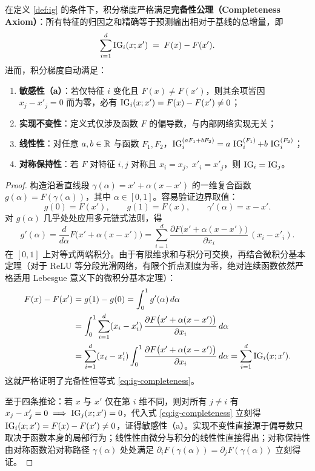 \begin{thmBox}
\begin{theorem}[积分梯度的完备性公理与导出性质]\label{thm:ig-completeness}
在定义 \ref{def:ig} 的条件下，积分梯度严格满足\textbf{完备性公理（Completeness Axiom）}：所有特征的归因之和精确等于预测输出相对于基线的总增量，即
\begin{equation}\label{eq:ig-completeness}
  \sum_{i=1}^d \operatorname{IG}_i(x; x') \;=\; F(x) - F(x').
\end{equation}
进而，积分梯度自动满足：
\begin{enumerate}
  \item \textbf{敏感性（a）}：若仅特征 $i$ 变化且 $F(x) \neq F(x')$，则其余项皆因 $x_j - x'_j = 0$ 而为零，必有 $\operatorname{IG}_i(x; x') = F(x) - F(x') \neq 0$；
  \item \textbf{实现不变性}：定义式仅涉及函数 $F$ 的偏导数，与内部网络实现无关；
  \item \textbf{线性性}：对任意 $a, b \in \mathbb{R}$ 与函数 $F_1, F_2$，$\operatorname{IG}_i^{(a F_1 + b F_2)} = a\,\operatorname{IG}_i^{(F_1)} + b\,\operatorname{IG}_i^{(F_2)}$；
  \item \textbf{对称保持性}：若 $F$ 对特征 $i, j$ 对称且 $x_i = x_j,\; x'_i = x'_j$，则 $\operatorname{IG}_i = \operatorname{IG}_j$。
\end{enumerate}
\end{theorem}
\end{thmBox}

\begin{proof}
构造沿着直线段 $\gamma(\alpha) = x' + \alpha(x - x')$ 的一维复合函数 $g(\alpha) = F(\gamma(\alpha))$，其中 $\alpha \in [0, 1]$。容易验证边界取值：
\[
  g(0) = F(x'), \qquad g(1) = F(x), \qquad \gamma'(\alpha) = x - x'.
\]
对 $g(\alpha)$ 几乎处处应用多元链式法则，得
\[
  g'(\alpha) = \frac{d}{d\alpha} F\big(x' + \alpha(x - x')\big)
  = \sum_{i=1}^d \frac{\partial F\big(x' + \alpha(x - x')\big)}{\partial x_i}\,(x_i - x'_i).
\]
在 $[0, 1]$ 上对等式两端积分。由于有限维求和与积分可交换，再结合微积分基本定理（对于 ReLU 等分段光滑网络，有限个折点测度为零，绝对连续函数依然严格适用 Lebesgue 意义下的微积分基本定理）：
\begin{align*}
  F(x) - F(x')
  &= g(1) - g(0)
   = \int_0^1 g'(\alpha)\,d\alpha \\
  &= \int_0^1 \sum_{i=1}^d (x_i - x'_i)\,\frac{\partial F\big(x' + \alpha(x - x')\big)}{\partial x_i}\,d\alpha \\
  &= \sum_{i=1}^d (x_i - x'_i)\int_0^1 \frac{\partial F\big(x' + \alpha(x - x')\big)}{\partial x_i}\,d\alpha
   = \sum_{i=1}^d \operatorname{IG}_i(x; x').
\end{align*}
这就严格证明了完备性恒等式 \eqref{eq:ig-completeness}。

至于四条推论：若 $x$ 与 $x'$ 仅在第 $i$ 维不同，则对所有 $j \neq i$ 有 $x_j - x'_j = 0 \implies \operatorname{IG}_j(x; x') = 0$，代入式 \eqref{eq:ig-completeness} 立刻得 $\operatorname{IG}_i(x; x') = F(x) - F(x') \neq 0$，证得敏感性（a）。实现不变性直接源于偏导数只取决于函数本身的局部行为；线性性由微分与积分的线性性直接得出；对称保持性由对称函数沿对称路径 $\gamma(\alpha)$ 处处满足 $\partial_i F(\gamma(\alpha)) = \partial_j F(\gamma(\alpha))$ 立刻得证。
\end{proof}

